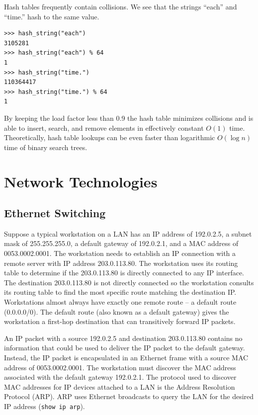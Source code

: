 \documentclass{book}
\begin{document}
Hash tables frequently contain collisions. We see that the strings ``each'' and ``time.'' hash to the same value.

\begin{lstlisting}
>>> hash_string("each")
3105281
>>> hash_string("each") % 64
1
>>> hash_string("time.")
110364417
>>> hash_string("time.") % 64
1
\end{lstlisting}

By keeping the load factor less than 0.9 the hash table minimizes collisions and is able to insert, search, and remove elements in effectively constant $O(1)$ time. Theoretically, hash table lookups can be even faster than logarithmic $O(\log{n})$ time of binary search trees.

\chapter{Network Technologies}

\section{Ethernet Switching}

Suppose a typical workstation on a LAN has an IP address of 192.0.2.5, a subnet mask of 255.255.255.0, a default gateway of 192.0.2.1, and a MAC address of 0053.0002.0001. The workstation needs to establish an IP connection with a remote server with IP address 203.0.113.80. The workstation uses its routing table to determine if the 203.0.113.80 is directly connected to any IP interface. The destination 203.0.113.80 is not directly connected so the workstation consults its routing table to find the most specific route matching the destination IP. Workstations almost always have exactly one remote route -- a default route (0.0.0.0/0). The default route (also known as a default gateway) gives the workstation a first-hop destination that can transitively forward IP packets.

An IP packet with a source 192.0.2.5 and destination 203.0.113.80 contains no information that could be used to deliver the IP packet to the default gateway. Instead, the IP packet is encapsulated in an Ethernet frame with a source MAC address of 0053.0002.0001. The workstation must discover the MAC address associated with the default gateway 192.0.2.1. The protocol used to discover MAC addresses for IP devices attached to a LAN is the Address Resolution Protocol (ARP). ARP uses Ethernet broadcasts to query the LAN for the desired IP address (\texttt{show ip arp}).
\end{document}
